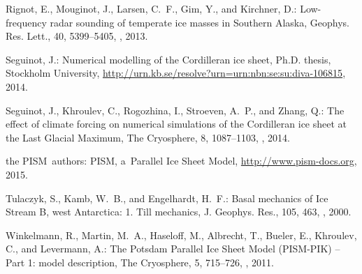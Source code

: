 \begin{thebibliography}{69}
Rignot, E., Mouginot, J., Larsen, C.~F., Gim, Y., and Kirchner, D.:
  Low-frequency radar sounding of temperate ice masses in Southern Alaska,
  Geophys. Res. Lett., 40, 5399--5405, , 2013.

Seguinot, J.: Numerical modelling of the Cordilleran ice sheet, Ph.D. thesis,
  Stockholm University,
  \urlprefix\url{http://urn.kb.se/resolve?urn=urn:nbn:se:su:diva-106815}, 2014.

Seguinot, J., Khroulev, C., Rogozhina, I., Stroeven, A.~P., and Zhang, Q.: The
  effect of climate forcing on numerical simulations of the {C}ordilleran ice
  sheet at the {L}ast {G}lacial {M}aximum, The Cryosphere, 8, 1087--1103,
  , 2014.

the PISM~authors: {PISM}, a~{P}arallel {I}ce {S}heet {M}odel,
  \urlprefix\url{http://www.pism-docs.org}, 2015.

Tulaczyk, S., Kamb, W.~B., and Engelhardt, H.~F.: Basal mechanics of Ice Stream
  B, west Antarctica: 1. Till mechanics, J. Geophys. Res., 105, 463,
  , 2000.

Winkelmann, R., Martin, M.~A., Haseloff, M., Albrecht, T., Bueler, E.,
  Khroulev, C., and Levermann, A.: The {P}otsdam {P}arallel {I}ce {S}heet
  {M}odel ({PISM-PIK}) -- Part 1: model description, The Cryosphere, 5,
  715--726, , 2011.

\end{thebibliography}


